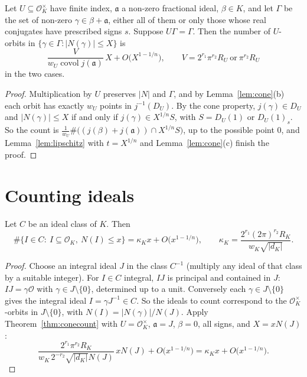 \begin{theorem}\label{thm:conecount}
Let $U\subseteq\mathcal O_K^\times$ have finite index, $\mathfrak a$ a non-zero fractional ideal, $\beta\in K$, and let $\Gamma$ be the
set of non-zero $\gamma\in\beta+\mathfrak a$, either all of them or only those whose real conjugates have prescribed signs $s$.
Suppose $U\Gamma=\Gamma$. Then the number of $U$-orbits in $\{\gamma\in\Gamma:|N(\gamma)|\le X\}$ is
\[
\frac{V}{w_U\operatorname{covol}j(\mathfrak a)}\,X+O\bigl(X^{1-1/n}\bigr),\qquad V=2^{r_1}\pi^{r_2}R_U\ \text{or}\ \pi^{r_2}R_U
\]
in the two cases.
\end{theorem}
\begin{proof}
Multiplication by $U$ preserves $|N|$ and $\Gamma$, and by Lemma~\ref{lem:cone}(b) each orbit has exactly $w_U$ points in
$j^{-1}(D_U)$. By the cone property, $j(\gamma)\in D_U$ and $|N(\gamma)|\le X$ if and only if $j(\gamma)\in X^{1/n}S$, with
$S=D_U(1)$ or $D_U(1)_s$. So the count is $\frac1{w_U}\#\bigl((j(\beta)+j(\mathfrak a))\cap X^{1/n}S\bigr)$, up to the possible point
$0$, and Lemma~\ref{lem:lipschitz} with $t=X^{1/n}$ and Lemma~\ref{lem:cone}(c) finish the proof.
\end{proof}

\section{Counting ideals}

\begin{theorem}\label{thm:idealcount}
Let $C$ be an ideal class of $K$. Then
\[
\#\{I\in C:\ I\subseteq\mathcal O_K,\ N(I)\le x\}=\kappa_Kx+O\bigl(x^{1-1/n}\bigr),\qquad
\kappa_K=\frac{2^{r_1}(2\pi)^{r_2}R_K}{w_K\sqrt{|d_K|}}.
\]
\end{theorem}
\begin{proof}
Choose an integral ideal $J$ in the class $C^{-1}$ (multiply any ideal of that class by a suitable integer). For $I\in C$
integral, $IJ$ is principal and contained in $J$: $IJ=\gamma\mathcal O$ with $\gamma\in J\setminus\{0\}$, determined up to a unit.
Conversely each $\gamma\in J\setminus\{0\}$ gives the integral ideal $I=\gamma J^{-1}\in C$. So the ideals to count correspond to the
$\mathcal O_K^\times$-orbits in $J\setminus\{0\}$, with $N(I)=|N(\gamma)|/N(J)$. Apply Theorem~\ref{thm:conecount} with $U=\mathcal
O_K^\times$, $\mathfrak a=J$, $\beta=0$, all signs, and $X=xN(J)$:
\[
\frac{2^{r_1}\pi^{r_2}R_K}{w_K\,2^{-r_2}\sqrt{|d_K|}N(J)}\,xN(J)+O\bigl(x^{1-1/n}\bigr)=\kappa_Kx+O\bigl(x^{1-1/n}\bigr).
\]
\end{proof}

